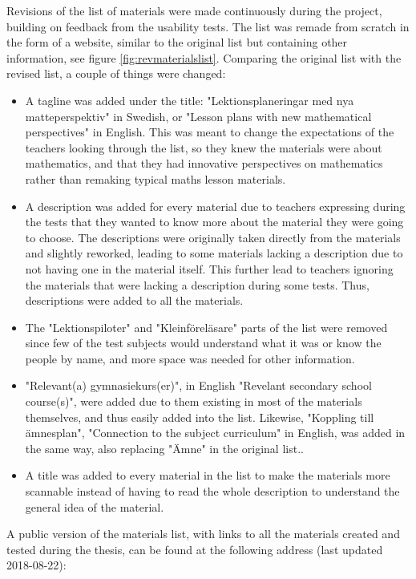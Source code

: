 Revisions of the list of materials were made continuously during the project, building on feedback from the usability tests. The list was remade from scratch in the form of a website, similar to the original list but containing other information, see figure \ref{fig:revmaterialslist}. Comparing the original list with the revised list, a couple of things were changed:
\begin{itemize}
	\item A tagline was added under the title: "Lektionsplaneringar med nya matteperspektiv" in Swedish, or "Lesson plans with new mathematical perspectives" in English. This was meant to change the expectations of the teachers looking through the list, so they knew the materials were about mathematics, and that they had innovative perspectives on mathematics rather than remaking typical maths lesson materials.
	\item A description was added for every material due to teachers expressing during the tests that they wanted to know more about the material they were going to choose. The descriptions were originally taken directly from the materials and slightly reworked, leading to some materials lacking a description due to not having one in the material itself. This further lead to teachers ignoring the materials that were lacking a description during some tests. Thus, descriptions were added to all the materials.
	\item The "Lektionspiloter" and "Kleinföreläsare" parts of the list were removed since few of the test subjects would understand what it was or know the people by name, and more space was needed for other information.
	\item "Relevant(a) gymnasiekurs(er)", in English "Revelant secondary school course(s)", were added due to them existing in most of the materials themselves, and thus easily added into the list. Likewise, "Koppling till ämnesplan", "Connection to the subject curriculum" in English, was added in the same way, also replacing "Ämne" in the original list..
	\item A title was added to every material in the list to make the materials more scannable instead of having to read the whole description to understand the general idea of the material.
\end{itemize}

A public version of the materials list, with links to all the materials created and tested during the thesis, can be found at the following address (last updated 2018-08-22):

